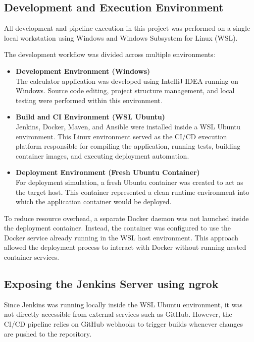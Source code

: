 \documentclass[12pt]{article}
\begin{document}
\subsection{Development and Execution Environment}

All development and pipeline execution in this project was performed on a
single local workstation using Windows and Windows Subsystem for Linux (WSL).

The development workflow was divided across multiple environments:

\begin{itemize}

\item \textbf{Development Environment (Windows)} \\
The calculator application was developed using IntelliJ IDEA running on
Windows. Source code editing, project structure management, and local testing
were performed within this environment.

\item \textbf{Build and CI Environment (WSL Ubuntu)} \\
Jenkins, Docker, Maven, and Ansible were installed inside a WSL Ubuntu
environment. This Linux environment served as the CI/CD execution platform
responsible for compiling the application, running tests, building container
images, and executing deployment automation.

\item \textbf{Deployment Environment (Fresh Ubuntu Container)} \\
For deployment simulation, a fresh Ubuntu container was created to act as the
target host. This container represented a clean runtime environment into which
the application container would be deployed.

\end{itemize}

To reduce resource overhead, a separate Docker daemon was not launched inside
the deployment container. Instead, the container was configured to use the
Docker service already running in the WSL host environment. This approach
allowed the deployment process to interact with Docker without running nested
container services.
\subsection{Exposing the Jenkins Server using ngrok}

Since Jenkins was running locally inside the WSL Ubuntu environment, it was not
directly accessible from external services such as GitHub. However, the CI/CD
pipeline relies on GitHub webhooks to trigger builds whenever changes are
pushed to the repository.
\end{document}
